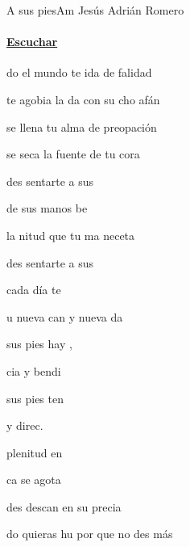 \documentclass[12pt, spanish]{book}
\newcommand{\NotCCLIed}{\relax}
\begin{document}
    \begin{song}{A sus pies}{Am}
    {} %
    {Jesús Adrián Romero}
    {} %
    {} %
        \ifChordBk
        \paragraph{\mbox{}\hfill\protect\href{https://open.spotify.com/intl-es/track/0YwFMo2jsOKL1dWEYHKccl}{Escuchar}\mbox{}\hfill}
        \fi


        \begin{SBOpGroup}
            do el mundo te ida de falidad

             te agobia la da con su cho afán

             se llena tu alma de preopación

             se seca la fuente de tu cora
        \end{SBOpGroup}

        \begin{SBChorus}
            des sentarte a sus 

             de sus manos be

            la nitud que tu ma neceta

            des sentarte a sus 

             cada día te

            u nueva can y nueva da

             sus pies hay ,

            cia y bendi

             sus pies ten

             y direc.

             plenitud en 

            ca se agota

            des descan en su precia
        \end{SBChorus}

        \begin{SBOpGroup}
            do quieras hu por que no des más


\end{SBOpGroup}
\end{song}
\end{document}
